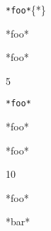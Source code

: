 
\def\mytitle{Raw Source}


\texttt{*foo*}\{*\}



*foo*



*foo*

5

\begin{lstlisting}[language={*}]
*foo*
\end{lstlisting}

*foo*

*foo*

10

*foo*

*bar*




